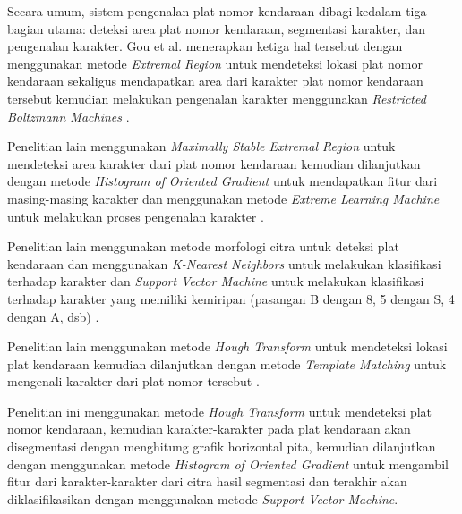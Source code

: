 \noindent Secara umum, sistem pengenalan plat nomor kendaraan dibagi kedalam tiga bagian utama: deteksi area plat nomor kendaraan, segmentasi karakter, dan pengenalan karakter. Gou et al. menerapkan ketiga hal tersebut dengan menggunakan metode \textit{Extremal Region} untuk mendeteksi lokasi plat nomor kendaraan sekaligus mendapatkan area dari karakter plat nomor kendaraan tersebut kemudian melakukan pengenalan karakter menggunakan \textit{Restricted Boltzmann Machines} \cite{gou2016}.

\noindent Penelitian lain menggunakan \textit{Maximally Stable Extremal Region} untuk mendeteksi area karakter dari plat nomor kendaraan kemudian dilanjutkan dengan metode \textit{Histogram of Oriented Gradient} untuk mendapatkan fitur dari masing-masing karakter dan menggunakan metode \textit{Extreme Learning Machine} untuk melakukan proses pengenalan karakter \cite{gou2014}.

\noindent Penelitian lain menggunakan metode morfologi citra untuk deteksi plat kendaraan dan menggunakan \textit{K-Nearest Neighbors} untuk melakukan klasifikasi terhadap karakter dan \textit{Support Vector Machine} untuk melakukan klasifikasi terhadap karakter yang memiliki kemiripan (pasangan B dengan 8, 5 dengan S, 4 dengan A, dsb) \cite{tabrizi}.

\noindent Penelitian lain menggunakan metode \textit{Hough Transform} untuk mendeteksi lokasi plat kendaraan kemudian dilanjutkan dengan metode \textit{Template Matching} untuk mengenali karakter dari plat nomor tersebut \cite{rasheed}. 

\noindent Penelitian ini menggunakan metode  \textit{Hough Transform} untuk mendeteksi plat nomor kendaraan, kemudian karakter-karakter pada plat kendaraan akan disegmentasi dengan menghitung grafik horizontal pita, kemudian dilanjutkan dengan menggunakan metode \textit{Histogram of Oriented Gradient} untuk mengambil fitur dari karakter-karakter dari citra hasil segmentasi dan terakhir akan diklasifikasikan dengan menggunakan metode \textit{Support Vector Machine}.



